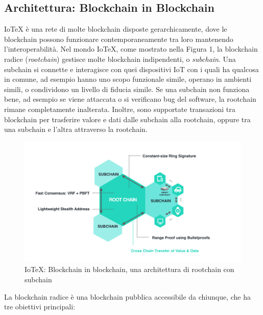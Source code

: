 \documentclass[a4paper,12pt]{article}
\begin{document}
\subsection{Architettura: Blockchain in Blockchain}
IoTeX è una rete di molte blockchain disposte gerarchicamente, dove le blockchain possono funzionare contemporaneamente tra loro mantenendo l'interoperabilità. Nel mondo IoTeX, come mostrato nella Figura 1, la blockchain radice (\emph{rootchain}) gestisce molte blockchain indipendenti, o \emph{subchain}. Una subchain si connette e interagisce con quei dispositivi IoT con i quali ha qualcosa in comune, ad esempio hanno uno scopo funzionale simile, operano in
ambienti simili, o condividono un livello di fiducia simile. Se una subchain non funziona bene, ad esempio se viene attaccata o si verificano bug del software, la rootchain rimane completamente inalterata. Inoltre, sono supportate transazioni tra blockchain per trasferire valore e dati dalle subchain alla rootchain, oppure tra una subchain e l'altra attraverso la rootchain.

\begin{figure}[h]
	\includegraphics[width=\textwidth]{figura1}
	\caption{IoTeX: Blockchain in blockchain, una architettura di rootchain con subchain}
\end{figure}

La blockchain radice è una blockchain pubblica accessibile da chiunque, che ha tre obiettivi principali:
\end{document}
